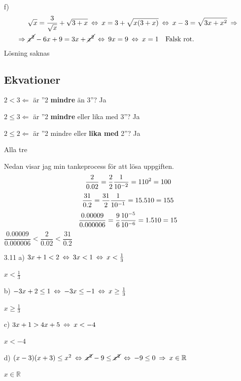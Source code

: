 \begin{task}{f)}
	\begin{align*}
	&\sqrt{x}=\dfrac{3}{\sqrt{x}}+\sqrt{3+x} \lra
	x=3+\sqrt{x(3+x)} \lra
	x-3=\sqrt{3x+x^2} \ra \\ \ra
	&\cancel{x^2}-6x+9=3x+\cancel{x^2} \lra
	9x=9 \lra
	x=1 \text{\quad Falsk rot.}
	\end{align*}
	\ans Lösning saknas
\end{task}

\subsection*{Ekvationer}

\begin{task}{3.9}
	$2<3 \Leftarrow$ är ''2 \textbf{mindre} än 3''? Ja
	
	$2 \le 3 \Leftarrow$ är ''2 \textbf{mindre} eller lika med 3''? Ja
	
	$2 \le 2 \Leftarrow$ är ''2 mindre eller \textbf{lika med} 2''? Ja
	
	\ans Alla tre
\end{task}

\begin{task}{3.10}
	Nedan visar jag min tankeprocess för att lösa uppgiften.
	\[\frac{2}{0.02}=
	\frac{2}{2}\*\frac{1}{10^{-2}}=
	1\*10^2=
	100\]
	\[\frac{31}{0.2}=
	\frac{31}{2}\*\frac{1}{10^{-1}}=
	15.5\*10=
	155\]
	\[\frac{0.00009}{0.000006}=
	\frac{9}{6}\*\frac{10^{-5}}{10^{-6}}=
	1.5\*10=
	15\]
	\ans $\dfrac{0.00009}{0.000006}<\dfrac{2}{0.02}<\dfrac{31}{0.2}$
\end{task}

\begin{task}{3.11 a)}
	$3x+1<2 \lra
	3x<1 \lra
	x<\frac{1}{3}$
	
	\ans $x<\frac{1}{3}$
\end{task}

\begin{task}{b)}
	$-3x+2\le1 \lra
	-3x\le-1 \lra
	x\ge\frac{1}{3}$
	
	\ans $x\ge\frac{1}{3}$
\end{task}

\begin{task}{c)}
	$3x+1>4x+5 \lra
	x<-4$
	
	\ans $x<-4$
\end{task}

\begin{task}{d)}
	$(x-3)(x+3)\le x^2 \lra
	\cancel{x^2}-9 \le \cancel{x^2} \lra
	-9 \le 0 \ra x\in\mathbb{R}$
	
	\ans $x\in\mathbb{R}$
\end{task}


